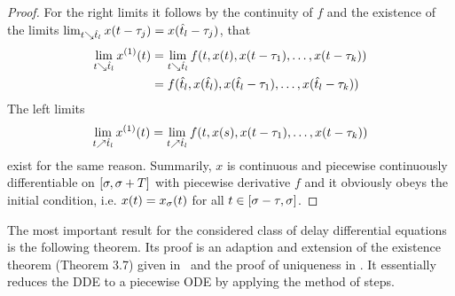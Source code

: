 \begin{proof}
        For the right limits it follows by the continuity of $f$ and the existence of the limits $\lim_{t\searrow\hat{t}_l} x(t-\tau_j) = x(\hat{t}_l-\tau_j)$, that
        \begin{align*}
            \lim_{t\downto\hat{t}_l} \D{x}(t)
            &= \lim_{t\downto\hat{t}_l} f(t,x(t),x(t-\tau_1),\ldots,x(t-\tau_k))\\
            &= f(\hat{t}_l,x(\hat{t}_l),x(\hat{t}_l-\tau_1),\ldots,x(\hat{t}_l-\tau_k))
        \end{align*}
        The left limits
        \begin{equation*}
            \lim_{t\upto\hat{t}_l} \D{x}(t) = \lim_{t\upto\hat{t}_l} f(t,x(s),x(t-\tau_1),\ldots,x(t-\tau_k))
        \end{equation*}
        exist for the same reason.
        Summarily, $x$ is continuous and piecewise continuously differentiable on $[\sigma,\sigma+T]$ with piecewise derivative $f$ and it obviously obeys the initial condition, i.e. $x(t)=x_{\sigma}(t)$ for all $t\in[\sigma-\tau,\sigma]$.
    \end{proof}

    The most important result for the considered class of delay differential equations is the following theorem.
    Its proof is an adaption and extension of the existence theorem (Theorem 3.7) given in~\cite{Smith10IntroDDE} and the proof of uniqueness in \cite{PruessWilke10GewDiffGl}. It essentially reduces the DDE to a piecewise ODE by applying the method of steps.

